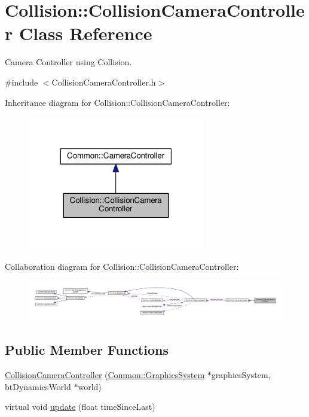 \hypertarget{class_collision_1_1_collision_camera_controller}{}\section{Collision\+:\+:Collision\+Camera\+Controller Class Reference}
\label{class_collision_1_1_collision_camera_controller}


Camera Controller using Collision.  




{\ttfamily \#include $<$Collision\+Camera\+Controller.\+h$>$}



Inheritance diagram for Collision\+:\+:Collision\+Camera\+Controller\+:\nopagebreak
\begin{figure}[H]
\begin{center}
\leavevmode
\includegraphics[width=219pt]{class_collision_1_1_collision_camera_controller__inherit__graph}
\end{center}
\end{figure}


Collaboration diagram for Collision\+:\+:Collision\+Camera\+Controller\+:\nopagebreak
\begin{figure}[H]
\begin{center}
\leavevmode
\includegraphics[width=350pt]{class_collision_1_1_collision_camera_controller__coll__graph}
\end{center}
\end{figure}
\subsection*{Public Member Functions}
\begin{DoxyCompactItemize}
\item 
\hyperlink{class_collision_1_1_collision_camera_controller_ac22915566c34afa0c50400e26dcb667b}{Collision\+Camera\+Controller} (\hyperlink{class_common_1_1_graphics_system}{Common\+::\+Graphics\+System} $\ast$graphics\+System, bt\+Dynamics\+World $\ast$world)
\item 
virtual void \hyperlink{class_collision_1_1_collision_camera_controller_ac25037b29b022a2ccf77b16fe0bda670}{update} (float time\+Since\+Last)
\end{DoxyCompactItemize}

